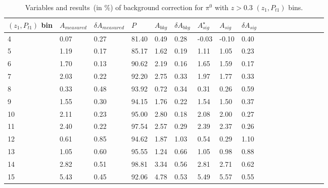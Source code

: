 \begin{table}[H]\footnotesize
\centering
\begin{tabular}{|l|l|l|l|l|l|l|l|l|l|l|l|l|l|l|l|l|l|}
\\ \hline
$(z_{1},P_{t1})$ bin & $A_{measured}$ & $\delta A_{measured}$ & $P$ & $A_{bkg}$ & $\delta A_{bkg}$ & $A_{sig}^{\star}$ & $ A_{sig}$  & $\delta A_{sig}$ \\ \hline
4 & 0.07 & 0.27 & 81.40 & 0.49 & 0.28 & -0.03 & -0.10 & 0.40 \\ \hline 
5 & 1.19 & 0.17 & 85.17 & 1.62 & 0.19 & 1.11 & 1.05 & 0.23 \\ \hline 
6 & 1.70 & 0.13 & 90.62 & 2.19 & 0.16 & 1.65 & 1.59 & 0.17 \\ \hline 
7 & 2.03 & 0.22 & 92.20 & 2.75 & 0.33 & 1.97 & 1.77 & 0.33 \\ \hline 
8 & 0.33 & 0.48 & 93.92 & 0.72 & 0.34 & 0.31 & 0.26 & 0.59 \\ \hline 
9 & 1.55 & 0.30 & 94.15 & 1.76 & 0.22 & 1.54 & 1.50 & 0.37 \\ \hline 
10 & 2.11 & 0.23 & 95.00 & 2.80 & 0.18 & 2.08 & 2.00 & 0.27 \\ \hline 
11 & 2.40 & 0.22 & 97.54 & 2.57 & 0.29 & 2.39 & 2.37 & 0.26 \\ \hline 
12 & 0.61 & 0.85 & 94.62 & 1.87 & 1.03 & 0.54 & 0.29 & 1.10 \\ \hline 
13 & 1.05 & 0.60 & 95.55 & 1.24 & 0.66 & 1.05 & 0.98 & 0.88 \\ \hline 
14 & 2.82 & 0.51 & 98.81 & 3.34 & 0.56 & 2.81 & 2.71 & 0.62 \\ \hline 
15 & 5.43 & 0.45 & 92.06 & 4.78 & 0.53 & 5.49 & 5.57 & 0.55 \\ \hline 
\end{tabular}
\caption{Variables and results~(in $\%$) of background correction for $\pi^0$ with $z>0.3$ $(z_1,P_{t1})$ bins.}
\label{tab:etazptbkgcor}
\end{table} 

